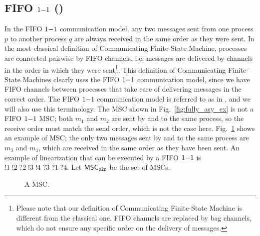 \subsection{FIFO $1\mathsf{-}1$ (\pp)}
In the FIFO $1\mathsf{-}1$ communication model, any two messages sent from one process $p$ to another process $q$ are always received in the same order as they were sent. In the most classical definition of Communicating Finite-State Machine, processes are connected pairwise by FIFO channels, i.e. messages are delivered by channels in the order in which they were sent\footnote{Please note that our definition of Communicating Finite-State Machine is different from the classical one. FIFO channels are replaced by bag channels, which do not ensure any specific order on the delivery of messages.}. This definition of Communicating Finite-State Machines clearly uses the FIFO $1\mathsf{-}1$ communication model, since we have FIFO channels between processes that take care of delivering messages in the correct order. The FIFO $1\mathsf{-}1$ communication model is referred to as \pp in \cite{DBLP:conf/concur/BolligGFLLS21}, and we will also use this terminology. The MSC shown in Fig.~\ref{fig:fully_asy_ex} is not a FIFO $1\mathsf{-}1$ MSC; both $m_1$ and $m_2$ are sent by and to the same process, so the receive order must match the send order, which is not the case here. Fig.~\ref{fig:pp_ex} shows an example of \pp MSC; the only two messages sent by and to the same process are $m_3$ and $m_4$, which are received in the same order as they have been sent. An example of linearization that can be executed by a FIFO $1\mathsf{-}1$ is $!1\;!2\;?2\;!3\;!4\;?3\;?1\;?4$. Let $\mathsf{MSC}_{\mathsf{p2p}}$ be the set of \pp MSCs.

\begin{figure}[h]
	\begin{center}
		\caption{A \pp MSC.}
		\label{fig:pp_ex}
	\end{center}
\end{figure}

